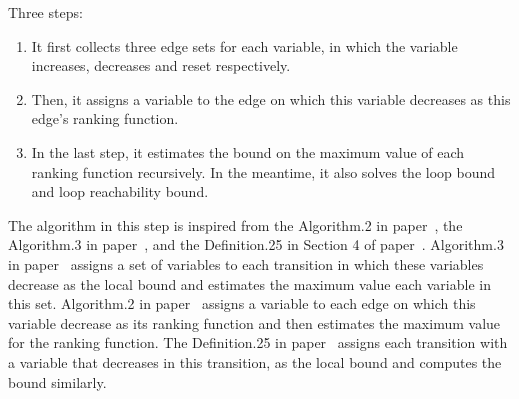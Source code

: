 Three steps:
\begin{enumerate}
    \item It first collects three edge sets for each variable,
  in which the variable increases, decreases and reset respectively.
  \item
  Then, it assigns a variable to the edge on which this variable decreases as this edge's ranking function.
  \item
  In the last step, it estimates the bound on the maximum value of each ranking function recursively.
  In the meantime, it also solves the loop bound and loop reachability bound.
  \end{enumerate}

  The algorithm in this step is inspired from the Algorithm.2 in paper~\cite{SinnZV14},
  the Algorithm.3 in paper~\cite{ZulegerGSV11},
  and the Definition.25 in Section 4 of paper~\cite{SinnZV17}.
  Algorithm.3 in paper~\cite{ZulegerGSV11} assigns a set of variables to each transition in which these variables decrease as the local bound
  and estimates the maximum value each variable in this set.
  Algorithm.2 in paper~\cite{SinnZV14} assigns a variable to each edge on which this variable decrease as its ranking function
  and then estimates the maximum value for the ranking function.
  The Definition.25 in paper~\cite{SinnZV17}
  assigns each transition with a variable that decreases in this transition, as the local bound and computes the bound similarly.
